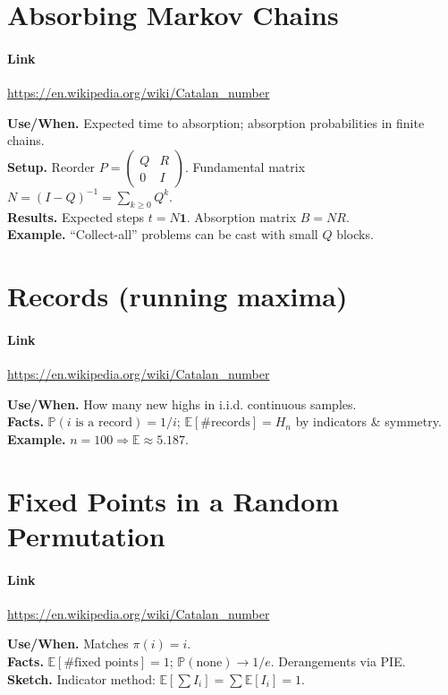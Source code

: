 \documentclass[11pt,A4,twoside]{article}
\let\oldsection\section
\renewcommand{\section}{\FloatBarrier\oldsection}
\numberwithin{equation}{section}
\newcommand{\E}{\mathbb{E}}
\theoremstyle{definition}
\theoremstyle{remark}
\newcommand{\Prob}{\mathbb{P}}
\begin{document}
\section{Absorbing Markov Chains}
\paragraph{Link} \url{https://en.wikipedia.org/wiki/Catalan_number}

\textbf{Use/When.} Expected time to absorption; absorption probabilities in finite chains.\\
\textbf{Setup.} Reorder \(P=\begin{pmatrix}Q&R\\0&I\end{pmatrix}\). Fundamental matrix \(N=(I-Q)^{-1}=\sum_{k\ge 0}Q^k\).\\
\textbf{Results.} Expected steps \(t=N\mathbf{1}\). Absorption matrix \(B=NR\).\\
\textbf{Example.} “Collect-all” problems can be cast with small \(Q\) blocks.

\section{Records (running maxima)}
\paragraph{Link} \url{https://en.wikipedia.org/wiki/Catalan_number}

\textbf{Use/When.} How many new highs in i.i.d. continuous samples.\\
\textbf{Facts.} \(\Prob(i\text{ is a record})=1/i\); \(\E[\#\text{records}]=H_n\) by indicators \& symmetry.\\
\textbf{Example.} \(n=100\Rightarrow \E\approx 5.187\).

\section{Fixed Points in a Random Permutation}
\paragraph{Link} \url{https://en.wikipedia.org/wiki/Catalan_number}

\textbf{Use/When.} Matches \(\pi(i)=i\).\\
\textbf{Facts.} \(\E[\#\text{fixed points}]=1\); \(\Prob(\text{none})\to 1/e\). Derangements via PIE.\\
\textbf{Sketch.} Indicator method: \(\E[\sum I_i]=\sum \E[I_i]=1\).
\end{document}
